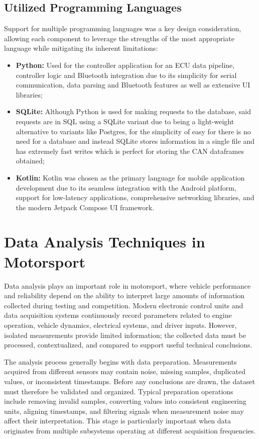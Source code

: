 \subsection{Utilized Programming Languages}

Support for multiple programming languages was a key design consideration, allowing each component to leverage the strengths of the most appropriate language while mitigating its inherent limitations:
\begin{itemize}
    \item \textbf{Python:} Used for the controller application for an ECU data pipeline, controller logic and Bluetooth integration due to its simplicity for serial communication, data parsing and Bluetooth features as well as extensive UI libraries;
    \item \textbf{SQLite:} Although Python is used for making requests to the database, said requests are in SQL using a SQLite variant due to being a light-weight alternative to variants like Postgres, for the simplicity of easy for there is no need for a database and instead SQLite stores information in a single file and has extremely fast writes which is perfect for storing the CAN dataframes obtained;
    \item \textbf{Kotlin:} Kotlin was chosen as the primary language for mobile application development due to its seamless integration with the Android platform, support for low-latency applications, comprehensive networking libraries, and the modern Jetpack Compose UI framework.
\end{itemize}


\section{Data Analysis Techniques in Motorsport}

Data analysis plays an important role in motorsport, where vehicle performance and reliability depend on the ability to interpret large amounts of information collected during testing and competition. Modern electronic control units and data acquisition systems continuously record parameters related to engine operation, vehicle dynamics, electrical systems, and driver inputs. However, isolated measurements provide limited information; the collected data must be processed, contextualized, and compared to support useful technical conclusions.

The analysis process generally begins with data preparation. Measurements acquired from different sensors may contain noise, missing samples, duplicated values, or inconsistent timestamps. Before any conclusions are drawn, the dataset must therefore be validated and organized. Typical preparation operations include removing invalid samples, converting values into consistent engineering units, aligning timestamps, and filtering signals when measurement noise may affect their interpretation. This stage is particularly important when data originates from multiple subsystems operating at different acquisition frequencies.

